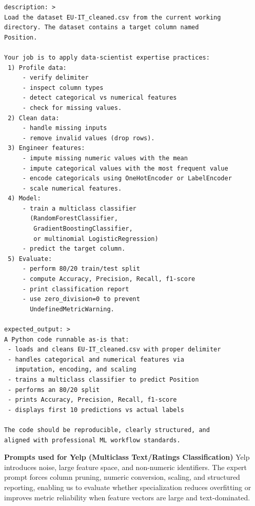 \begin{tcolorbox}[ left=2pt,   right=2pt,   top=2pt,   bottom=2pt, colback=gray!5,colframe=black!40,title={Expertise instruction prompt}]
\scriptsize
\setlength{\baselineskip}{0.6\baselineskip} \begin{verbatim}
description: >
Load the dataset EU-IT_cleaned.csv from the current working 
directory. The dataset contains a target column named 
Position.
    
Your job is to apply data-scientist expertise practices:
 1) Profile data:
     - verify delimiter
     - inspect column types
     - detect categorical vs numerical features
     - check for missing values.
 2) Clean data:
     - handle missing inputs
     - remove invalid values (drop rows).
 3) Engineer features:
     - impute missing numeric values with the mean
     - impute categorical values with the most frequent value
     - encode categoricals using OneHotEncoder or LabelEncoder
     - scale numerical features.
 4) Model:
     - train a multiclass classifier
       (RandomForestClassifier,
        GradientBoostingClassifier,
        or multinomial LogisticRegression)
     - predict the target column.
 5) Evaluate:
     - perform 80/20 train/test split
     - compute Accuracy, Precision, Recall, f1-score
     - print classification report
     - use zero_division=0 to prevent 
       UndefinedMetricWarning.

expected_output: >
A Python code runnable as-is that:
 - loads and cleans EU-IT_cleaned.csv with proper delimiter
 - handles categorical and numerical features via 
   imputation, encoding, and scaling
 - trains a multiclass classifier to predict Position
 - performs an 80/20 split
 - prints Accuracy, Precision, Recall, f1-score
 - displays first 10 predictions vs actual labels

The code should be reproducible, clearly structured, and 
aligned with professional ML workflow standards.
\end{verbatim}
\end{tcolorbox}


\newpage
\textbf{Prompts used for Yelp (Multiclass Text/Ratings Classification)}  
Yelp introduces noise, large feature space, and non-numeric identifiers.  
The expert prompt forces column pruning, numeric conversion, scaling, and structured reporting, enabling us to evaluate whether specialization reduces overfitting or improves metric reliability when feature vectors are large and text-dominated.

